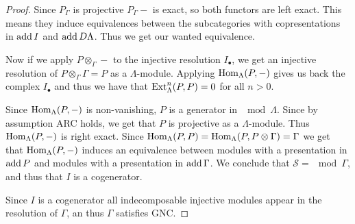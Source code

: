 \begin{theorem}
\begin{proof}
		Since $P_\Gamma$ is projective $P_\Gamma -$ is exact, so both functors are left exact. This means they induce equivalences between the subcategories with copresentations in $\operatorname{add} I$ and $\operatorname{add} D\Lambda$. Thus we get our wanted equivalence.
		
		Now if we apply $P\otimes_\Gamma -$ to the injective resolution $I_\bullet$, we get an injective resolution of $P\otimes_\Gamma\Gamma = P$ as a $\Lambda$-module. Applying $\operatorname{Hom}_\Lambda(P, -)$ gives us back the complex $I_\bullet$ and thus we have that $\operatorname{Ext}_\Lambda^n(P, P)=0$ for all $n>0$. 
		
		Since $\operatorname{Hom}_\Lambda(P, -)$ is non-vanishing, $P$ is a generator in $\mod\Lambda$. Since by assumption ARC holds, we get that $P$ is projective as a $\Lambda$-module. Thus $\operatorname{Hom}_\Lambda(P, -)$ is right exact. Since $\operatorname{Hom}_\Lambda(P, P) = \operatorname{Hom}_\Lambda(P, P\otimes \Gamma) = \Gamma$ we get that $\operatorname{Hom}_\Lambda(P,-)$ induces an equivalence between modules with a presentation in $\operatorname{add} P$ and modules with a presentation in $\operatorname{add} \Gamma$. We conclude that $\mathcal S = \mod\Gamma$, and thus that $I$ is a cogenerator.
		
		Since $I$ is a cogenerator all indecomposable injective modules appear in the resolution of $\Gamma$, an thus $\Gamma$ satisfies GNC.
	\end{proof}
\end{theorem}